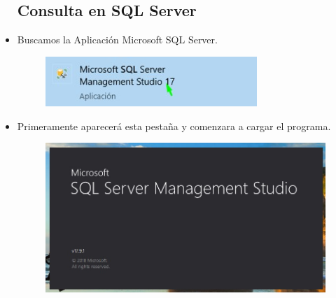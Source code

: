 \begin{itemize}
			\subsection{Consulta en SQL Server}
				\item Buscamos la Aplicación Microsoft SQL Server.
					\begin{figure}[htb]
						\begin{center}
							\includegraphics[width=8cm]{./Imagenes/BuscarSQL}
						\end{center}
					\end{figure}
				\item Primeramente aparecerá esta pestaña y comenzara a cargar el programa.
					\begin{figure}[htb]
						\begin{center}
							\includegraphics[width=12cm]{./Imagenes/InicioSql}
						\end{center}
					\end{figure}
					

\end{itemize}
